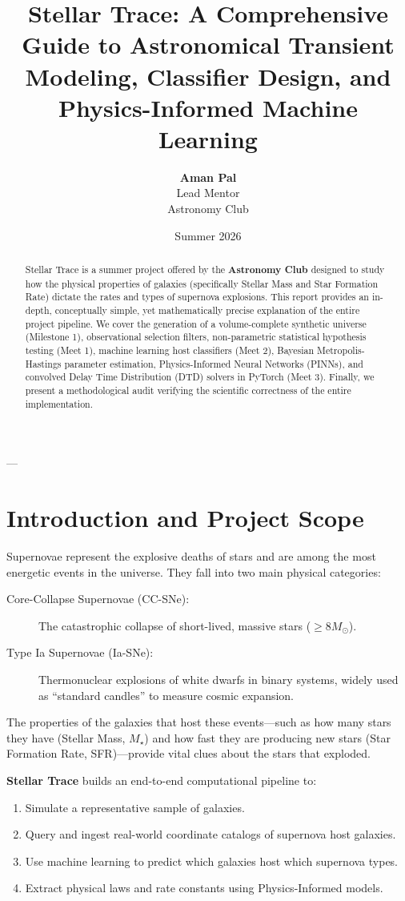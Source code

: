 \documentclass[11pt,a4paper]{article}
\title{\textbf{Stellar Trace: A Comprehensive Guide to Astronomical Transient Modeling, Classifier Design, and Physics-Informed Machine Learning}}
\author{\textbf{Aman Pal} \\ Lead Mentor \\ Astronomy Club}
\date{Summer 2026}
\begin{document}
\maketitle

\begin{abstract}
Stellar Trace is a summer project offered by the \textbf{Astronomy Club} designed to study how the physical properties of galaxies (specifically Stellar Mass and Star Formation Rate) dictate the rates and types of supernova explosions. This report provides an in-depth, conceptually simple, yet mathematically precise explanation of the entire project pipeline. We cover the generation of a volume-complete synthetic universe (Milestone 1), observational selection filters, non-parametric statistical hypothesis testing (Meet 1), machine learning host classifiers (Meet 2), Bayesian Metropolis-Hastings parameter estimation, Physics-Informed Neural Networks (PINNs), and convolved Delay Time Distribution (DTD) solvers in PyTorch (Meet 3). Finally, we present a methodological audit verifying the scientific correctness of the entire implementation.
\end{abstract}

\newpage
\tableofcontents
\newpage

---

\section{Introduction and Project Scope}
Supernovae represent the explosive deaths of stars and are among the most energetic events in the universe. They fall into two main physical categories:
\begin{description}
    \item[Core-Collapse Supernovae (CC-SNe):] The catastrophic collapse of short-lived, massive stars ($\ge 8 M_\odot$).
    \item[Type Ia Supernovae (Ia-SNe):] Thermonuclear explosions of white dwarfs in binary systems, widely used as ``standard candles'' to measure cosmic expansion.
\end{description}

The properties of the galaxies that host these events—such as how many stars they have (Stellar Mass, $M_\star$) and how fast they are producing new stars (Star Formation Rate, SFR)—provide vital clues about the stars that exploded. 

\textbf{Stellar Trace} builds an end-to-end computational pipeline to:
\begin{enumerate}
    \item Simulate a representative sample of galaxies.
    \item Query and ingest real-world coordinate catalogs of supernova host galaxies.
    \item Use machine learning to predict which galaxies host which supernova types.
    \item Extract physical laws and rate constants using Physics-Informed models.
\end{enumerate}
\end{document}
